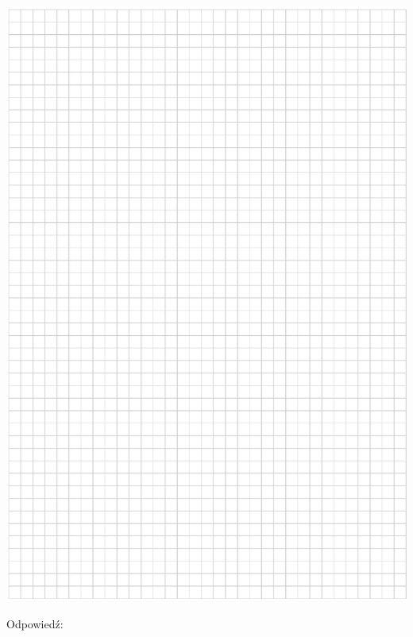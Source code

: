 \documentclass[10pt]{article}
\begin{document}
\includegraphics[max width=\textwidth, center]{2024_11_21_d9af6ed2d610d3f2d2cbg-11}

Odpowiedź:
\end{document}
